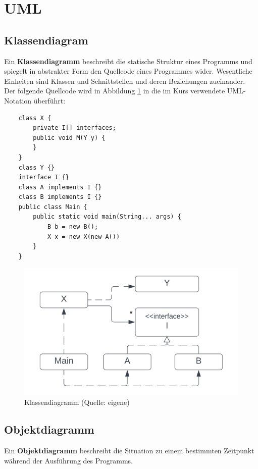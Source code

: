 \section{UML}

\subsection*{Klassendiagram}
Ein \textbf{Klassendiagramm} beschreibt die statische Struktur eines Programms und spiegelt in abstrakter Form den Quellcode eines Programmes wider.
Wesentliche Einheiten sind Klassen und Schnittstellen und deren Beziehungen zueinander.
Der folgende Quellcode wird in Abbildung \ref{fig:cc-classdiagram} in die im Kurs verwendete UML-Notation überführt:

\begin{verbatim}
    class X {
        private I[] interfaces;
        public void M(Y y) {
        }
    }
    class Y {}
    interface I {}
    class A implements I {}
    class B implements I {}
    public class Main {
        public static void main(String... args) {
            B b = new B();
            X x = new X(new A())
        }
    }
\end{verbatim}

\begin{figure}
    \centering
    \includegraphics[scale=0.35]{chapters/Anhang/CheatSheets/img/classdiagram}
    \caption{Klassendiagramm (Quelle: eigene)}
    \label{fig:cc-classdiagram}
\end{figure}

\subsection*{Objektdiagramm}
Ein \textbf{Objektdiagramm} beschreibt die Situation zu einem bestimmten Zeitpunkt während der Ausführung des Programms.\\

